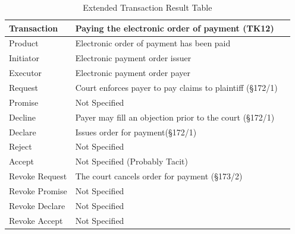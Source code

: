 \begin{landscape}
\begin{table}[h]
\caption{Extended Transaction Result Table}
\label{tab:etrt}
\begin{tabular}{|l||l|l|}
\hline
Transaction  &  Paying the electronic order of payment (TK12) \\ \hline
Product      &  Electronic order of payment has been paid \\ \hline
Initiator      &  Electronic payment order issuer \\ \hline
Executor       &  Electronic payment order payer \\ \hline
Request        &    Court enforces payer to pay claims to plaintiff (\S172/1)
  \\ \hline
Promise        &    Not Specified   \\ \hline
Decline        &  Payer may fill an objection prior to the court (\S172/1)  \\ \hline
Declare        &  Issues order for payment(\S172/1)  \\ \hline
Reject         &  Not Specified   \\ \hline
Accept         & Not Specified (Probably Tacit) \\ \hline
Revoke Request & The court cancels order for payment (\S173/2)       \\ \hline
Revoke Promise & Not Specified  \\ \hline
Revoke Declare & Not Specified      \\ \hline
Revoke Accept  &  Not Specified \\ \hline
\end{tabular}
\end{table}


\end{landscape}
